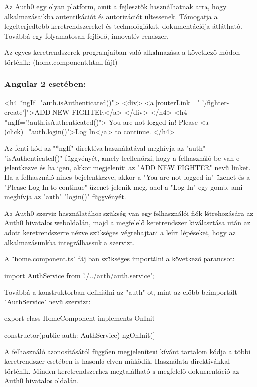 
Az Auth0 egy olyan platform, amit a fejlesztők használhatnak arra, hogy alkalmazásaikba autentikációt és autorizációt ültessenek. Támogatja a legelterjedtebb keretrendszereket és technológiákat, dokumentációja átlátható. Továbbá egy folyamatosan fejlődő, innovatív rendszer. \cite{Auth0}

Az egyes keretrendszerek programjaiban való alkalmazása a következő módon történik: (home.component.html fájl)

\subsubsection{Angular 2 esetében:}

\begin{cpp}
<h4 *ngIf="auth.isAuthenticated()">
    <div>
   	<a [routerLink]="['/fighter-create']">ADD NEW FIGHTER</a>
   	</div>
</h4>
<h4 *ngIf="!auth.isAuthenticated()">
  You are not logged in! Please 
  <a (click)="auth.login()">Log In</a> to continue.
</h4>
\end{cpp}

Az fenti kód az "*ngIf" direktíva használatával meghívja az "auth" "isAuthenticated()" függvényét, amely leellenőrzi, hogy a felhasználó be van e jelentkezve és ha igen, akkor megjeleníti az "ADD NEW FIGHTER" nevű linket. Ha a felhasználó nincs bejelentkezve, akkor a "You are not logged in" üzenet és a "Please Log In to continue" üzenet jelenik meg, ahol a "Log In" egy gomb, ami meghívja az "auth" "login()" függvényét.

Az Auth0 szerviz használatához szükség van egy felhasználói fiók létrehozására az Auth0 hivatalos weboldalán, majd a megfelelő keretrendszer kiválasztása után az adott keretrendszerre nézve szükséges végrehajtani a leírt lépéseket, hogy az alkalmazásunkba integrálhassuk a szervizt.

A "home.component.ts" fájlban szükséges importálni a következő parancsot:
\begin{cpp}
import { AuthService } from './../auth/auth.service';
\end{cpp}

Továbbá a konstruktorban definiálni az "auth"-ot, mint az előbb beimportált\\ "AuthService" nevű szervizt:
\begin{cpp}
export class HomeComponent implements OnInit {

  constructor(public auth: AuthService) { }
  ngOnInit() {
  }
}
\end{cpp}

A felhasználó azonosításától függően megjeleníteni kívánt tartalom kódja a többi keretrendszer esetében is hasonló elven működik. Használata direktívákkal történik. Minden keretrendszerhez megtalálható a megfelelő dokumentáció az Auth0 hivatalos oldalán. \cite{Auth0}